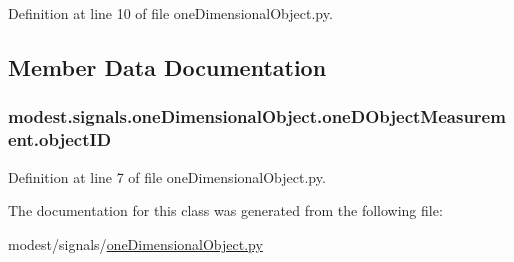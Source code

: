 Definition at line 10 of file one\+Dimensional\+Object.\+py.



\subsection{Member Data Documentation}
\subsubsection[{\texorpdfstring{object\+ID}{objectID}}]{\setlength{\rightskip}{0pt plus 5cm}modest.\+signals.\+one\+Dimensional\+Object.\+one\+D\+Object\+Measurement.\+object\+ID}\hypertarget{classmodest_1_1signals_1_1oneDimensionalObject_1_1oneDObjectMeasurement_a998f41f9e1ef63fc336f4c1d52c1aa4b}{}\label{classmodest_1_1signals_1_1oneDimensionalObject_1_1oneDObjectMeasurement_a998f41f9e1ef63fc336f4c1d52c1aa4b}


Definition at line 7 of file one\+Dimensional\+Object.\+py.



The documentation for this class was generated from the following file\+:\begin{DoxyCompactItemize}
\item 
modest/signals/\hyperlink{oneDimensionalObject_8py}{one\+Dimensional\+Object.\+py}\end{DoxyCompactItemize}
